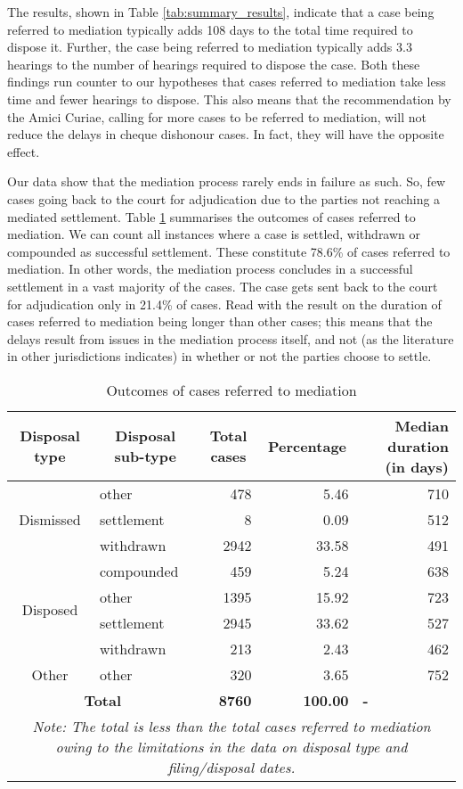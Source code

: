 The results, shown in Table \ref{tab:summary_results}, indicate that a case being referred to mediation typically adds 108 days to the total time required to dispose it. Further, the case being referred to mediation typically adds 3.3 hearings to the number of hearings required to dispose the case. Both these findings run counter to our hypotheses that cases referred to mediation take less time and fewer hearings to dispose. This also means that the recommendation by the Amici Curiae, calling for more cases to be referred to mediation, will not reduce the delays in cheque dishonour cases. In fact, they will have the opposite effect.

Our data show that the mediation process rarely ends in failure as such. So, few cases going back to the court for adjudication due to the parties not reaching a mediated settlement. Table \ref{tab:mediation} summarises the outcomes of cases referred to mediation. We can count all instances where a case is settled, withdrawn or compounded as successful settlement. These constitute 78.6\% of cases referred to mediation. In other words, the mediation process concludes in a successful settlement in a vast majority of the cases. The case gets sent back to the court for adjudication only in 21.4\% of cases. Read with the result on the duration of cases referred to mediation being longer than other cases; this means that the delays result from issues in the mediation process itself, and not (as the literature in other jurisdictions indicates) in whether or not the parties choose to settle.

{\footnotesize \begin{longtable}{@{}clrrr@{}}
\caption{Outcomes of cases referred to mediation}
\label{tab:mediation}\\
\toprule
 \textbf{Disposal type} & \multicolumn{1}{c}{\textbf{Disposal sub-type}} & \multicolumn{1}{c}{\textbf{Total cases}} & \multicolumn{1}{c}{\textbf{Percentage}} & \multicolumn{1}{p{3cm}}{\textbf{Median duration (in days)}} \\
 \midrule
\endhead
\multirow{3}{*}{Dismissed} & other & 478 & 5.46 & 710 \\
 & settlement & 8 & 0.09 & 512 \\
 & withdrawn & 2942 & 33.58 & 491 \\
 \midrule
\multirow{4}{*}{Disposed} & compounded & 459 & 5.24 & 638 \\
 & other & 1395 & 15.92 & 723 \\
 & settlement & 2945 & 33.62 & 527 \\
 & withdrawn & 213 & 2.43 & 462 \\
 \midrule
 Other & other & 320 & 3.65 & 752 \\
 \midrule
 \multicolumn{2}{c}{\textbf{Total}} & \textbf{8760} & \textbf{100.00} & \multicolumn{1}{l}{\textbf{-}} \\
 \bottomrule
 \multicolumn{5}{p{11cm}}{{\footnotesize \emph{Note: The total is less than the total cases referred to mediation owing to the limitations in the data on disposal type and filing/disposal dates.}}}
\end{longtable}}


